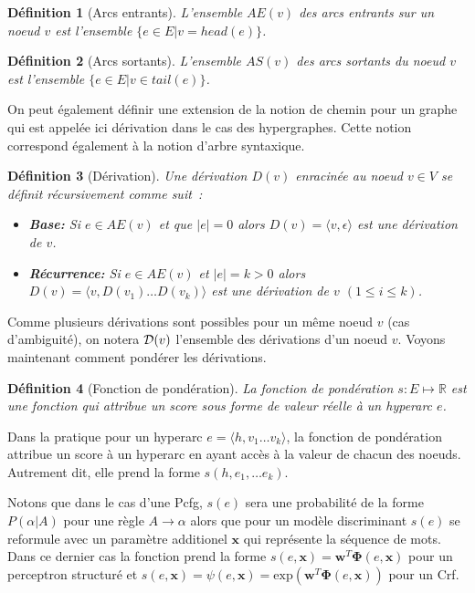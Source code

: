 \documentclass[11pt,openany]{book}
\newtheorem{definition}{Définition}[chapter]
\begin{document}
\begin{definition}[Arcs entrants]
L'ensemble $AE(v)$ des arcs entrants sur un noeud $v$ est l'ensemble $\{e \in E | v =  head(e) \}$.
\end{definition}

\begin{definition}[Arcs sortants]
L'ensemble $AS(v)$ des arcs sortants du noeud $v$ est l'ensemble $\{e \in E | v \in tail(e) \}$.
\end{definition}

On peut également définir une extension de la notion de chemin pour un graphe 
qui est appelée ici dérivation dans le cas des hypergraphes. Cette notion correspond également à la notion d'arbre syntaxique.

\begin{definition}[Dérivation]
Une dérivation $D(v)$ enracinée au noeud $v \in V$ se définit récursivement comme suit~: 
\begin{itemize}
\item {\bf Base:} Si $e \in AE(v)$ et que $|e| = 0$ alors $D(v) = \langle v,\epsilon\rangle$ est une dérivation de $v$.
\item {\bf Récurrence:} Si $e \in AE(v)$ et $|e| = k > 0$ alors $D(v) =
  \langle v, D(v_1)\ldots D(v_k) \rangle$ est une dérivation de $v$
  $(1\leq i \leq k)$.
\end{itemize}
\end{definition}
Comme plusieurs dérivations sont possibles pour un même noeud $v$ (cas d'ambiguité),
on notera ${\cal D}(v)$ l'ensemble des dérivations d'un noeud $v$. Voyons maintenant comment pondérer les dérivations.

\begin{definition}[Fonction de pondération]
La fonction de pondération $s:E\mapsto \mathbb{R}$ est une fonction qui attribue un score sous forme de valeur réelle
à un hyperarc $e$. 
\end{definition}
Dans la pratique pour un hyperarc $e=\langle h, v_1\ldots v_k \rangle$, la fonction de pondération attribue un score
à un hyperarc en ayant accès à la valeur de chacun des noeuds. Autrement dit, elle prend la forme $s(h,e_1,\ldots e_k)$.


Notons que dans le cas d'une {\sc Pcfg}, $s(e)$ sera une probabilité de
la forme $P(\alpha | A )$ pour une règle $A\rightarrow \alpha$ alors
que pour un modèle discriminant $s(e)$ se reformule avec un paramètre
additionel $\mathbf{x}$ qui représente la séquence de mots.
Dans ce dernier cas la fonction prend la forme $s(e,\mathbf{x}) =
\mathbf{w}^T \boldsymbol\Phi(e,\mathbf{x})$ pour un perceptron
structuré
et $s(e,\mathbf{x}) =
\psi(e,\mathbf{x}) = \text{exp}(\mathbf{w}^T \boldsymbol\Phi(e,\mathbf{x}))$ pour un {\sc Crf}.
\end{document}

